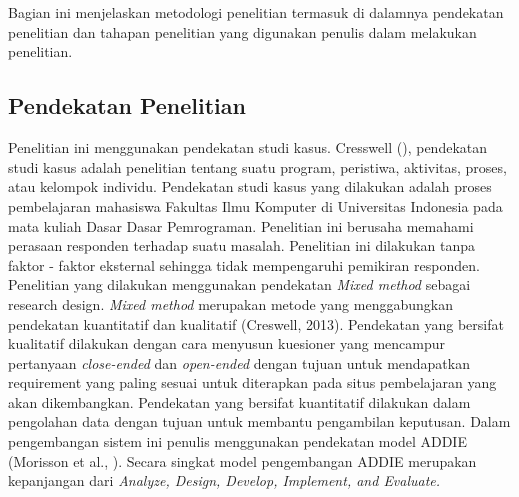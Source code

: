 \chapter{\babTiga}
Bagian ini menjelaskan metodologi penelitian termasuk di dalamnya pendekatan penelitian dan tahapan penelitian yang digunakan penulis dalam melakukan penelitian.
\section{Pendekatan Penelitian}

Penelitian ini  menggunakan pendekatan studi kasus. Cresswell (\citeyear{papper.Creswell}), pendekatan studi kasus adalah penelitian tentang suatu program, peristiwa, aktivitas, proses, atau kelompok individu.
\linebreak\linebreak
Pendekatan studi kasus yang dilakukan adalah proses pembelajaran mahasiswa Fakultas Ilmu Komputer di Universitas Indonesia pada mata kuliah Dasar Dasar Pemrograman. Penelitian ini berusaha memahami perasaan responden terhadap suatu masalah. Penelitian ini dilakukan tanpa faktor - faktor eksternal sehingga tidak mempengaruhi pemikiran responden.
\linebreak\linebreak
Penelitian yang dilakukan menggunakan pendekatan \textit{Mixed method} sebagai research design. \textit{Mixed method} merupakan metode yang menggabungkan pendekatan kuantitatif dan kualitatif (Creswell, 2013). Pendekatan yang bersifat kualitatif dilakukan dengan cara menyusun kuesioner yang mencampur pertanyaan \textit{close-ended} dan \textit{open-ended} dengan tujuan untuk mendapatkan requirement yang paling sesuai untuk diterapkan pada situs pembelajaran yang akan dikembangkan. Pendekatan yang bersifat kuantitatif dilakukan dalam pengolahan data dengan tujuan untuk membantu pengambilan keputusan.
\linebreak\linebreak
Dalam pengembangan sistem ini penulis menggunakan pendekatan model ADDIE  (Morisson et al., \citeyear{book.morisson}). Secara singkat model pengembangan ADDIE merupakan kepanjangan dari \textit{Analyze, Design, Develop, Implement, and Evaluate.}

